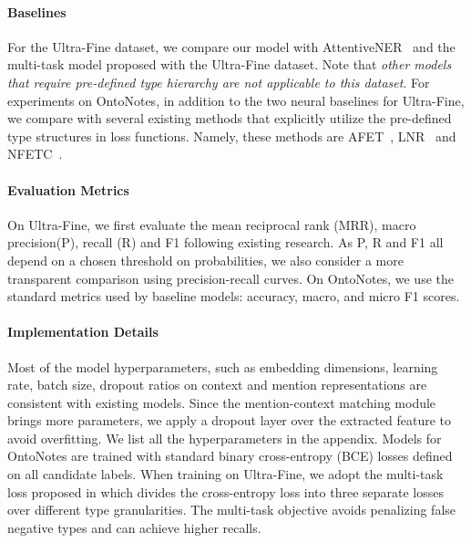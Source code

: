 \documentclass[11pt,a4paper]{article}
\begin{document}
\paragraph{Baselines} For the Ultra-Fine dataset, we compare our model with AttentiveNER~\cite{shimaoka2016attentive} and the multi-task model proposed with the Ultra-Fine dataset. Note that \emph{other models that require pre-defined type hierarchy are not applicable to this dataset}. For experiments on OntoNotes, in addition to the two neural baselines for Ultra-Fine, we compare with several existing methods that explicitly utilize the pre-defined type structures in loss functions. Namely, these methods are AFET~\cite{ren2016afet}, LNR~\cite{ren2016label} and NFETC~\cite{xu2018neural}.






\paragraph{Evaluation Metrics} On Ultra-Fine, we first evaluate the mean reciprocal rank (MRR), macro precision(P), recall (R) and F1 following existing research. As P, R and F1 all depend on a chosen threshold on probabilities, we also consider a more transparent comparison using precision-recall curves. On OntoNotes, we use the standard metrics used by baseline models: accuracy, macro, and micro F1 scores.

\paragraph{Implementation Details} Most of the model hyperparameters, such as embedding dimensions, learning rate, batch size, dropout ratios on context and mention representations are consistent with existing models. Since the mention-context matching module brings more parameters, we apply a dropout layer over the extracted feature  to avoid overfitting. We list all the hyperparameters in the appendix. Models for OntoNotes are trained with standard binary cross-entropy (BCE) losses defined on all candidate labels. When training on Ultra-Fine, we adopt the multi-task loss proposed in \citet{choi2018ultra} which divides the cross-entropy loss into three separate losses over different type granularities. The multi-task objective avoids penalizing false negative types and can achieve higher recalls.
\end{document}

